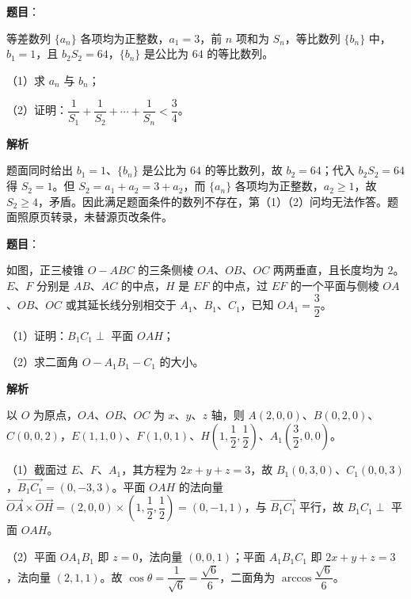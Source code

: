 \begin{answer}

\textbf{题目}：

等差数列 $\{a_n\}$ 各项均为正整数，$a_1=3$，前 $n$ 项和为 $S_n$，等比数列 $\{b_n\}$ 中，$b_1=1$，且 $b_2S_2=64$，$\{b_n\}$ 是公比为 $64$ 的等比数列。

（1）求 $a_n$ 与 $b_n$；

（2）证明：$\dfrac1{S_1}+\dfrac1{S_2}+\cdots+\dfrac1{S_n}<\dfrac34$。

\textbf{解析}

题面同时给出 $b_1=1$、$\{b_n\}$ 是公比为 $64$ 的等比数列，故 $b_2=64$；代入 $b_2S_2=64$ 得 $S_2=1$。但 $S_2=a_1+a_2=3+a_2$，而 $\{a_n\}$ 各项均为正整数，$a_2\geqslant1$，故 $S_2\geqslant4$，矛盾。因此满足题面条件的数列不存在，第（1）（2）问均无法作答。题面照原页转录，未替源页改条件。


\end{answer}
\begin{answer}

\textbf{题目}：

如图，正三棱锥 $O-ABC$ 的三条侧棱 $OA$、$OB$、$OC$ 两两垂直，且长度均为 $2$。$E$、$F$ 分别是 $AB$、$AC$ 的中点，$H$ 是 $EF$ 的中点，过 $EF$ 的一个平面与侧棱 $OA$、$OB$、$OC$ 或其延长线分别相交于 $A_1$、$B_1$、$C_1$，已知 $OA_1=\dfrac32$。

（1）证明：$B_1C_1\perp$ 平面 $OAH$；

（2）求二面角 $O-A_1B_1-C_1$ 的大小。
\nopagebreak[4]
\begin{center}\end{center}
\nopagebreak[4]
\textbf{解析}

以 $O$ 为原点，$OA$、$OB$、$OC$ 为 $x$、$y$、$z$ 轴，则 $A(2,0,0)$、$B(0,2,0)$、$C(0,0,2)$，$E(1,1,0)$、$F(1,0,1)$、$H\left(1,\dfrac12,\dfrac12\right)$、$A_1\left(\dfrac32,0,0\right)$。

（1）截面过 $E$、$F$、$A_1$，其方程为 $2x+y+z=3$，故 $B_1(0,3,0)$、$C_1(0,0,3)$，$\overrightarrow{B_1C_1}=(0,-3,3)$。平面 $OAH$ 的法向量 $\overrightarrow{OA}\times\overrightarrow{OH}=(2,0,0)\times\left(1,\dfrac12,\dfrac12\right)=(0,-1,1)$，与 $\overrightarrow{B_1C_1}$ 平行，故 $B_1C_1\perp$ 平面 $OAH$。

（2）平面 $OA_1B_1$ 即 $z=0$，法向量 $(0,0,1)$；平面 $A_1B_1C_1$ 即 $2x+y+z=3$，法向量 $(2,1,1)$。故 $\cos\theta=\dfrac1{\sqrt6}=\dfrac{\sqrt6}6$，二面角为 $\arccos\dfrac{\sqrt6}6$。


\end{answer}
